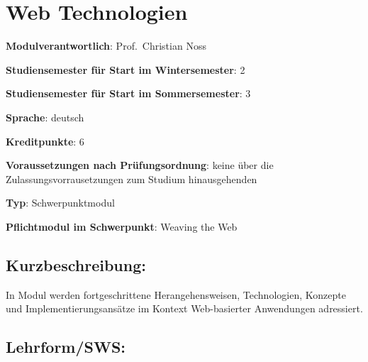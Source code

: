 \chapter{Web
Technologien\label{/mi-2017/modulbeschreibungen-master/MA_WTW_Modul_Web-Technologien}}\label{web-technologienpathlabelmi-2017modulbeschreibungen-mastermaux5fwtwux5fmodulux5fweb-technologien}

\begin{modulHead}
\textbf{Modulverantwortlich}: Prof.~Christian
Noss
\end{modulHead}
\begin{modulHead}
\textbf{Studiensemester für
Start im Wintersemester}:
2
\end{modulHead}
\begin{modulHead}
\textbf{Studiensemester für Start
im Sommersemester}:
3
\end{modulHead}
\begin{modulHead}
\textbf{Sprache}:
deutsch
\end{modulHead}
\begin{modulHead}
\textbf{Kreditpunkte}:
6
\end{modulHead}
\begin{modulHead}
\textbf{Voraussetzungen nach
Prüfungsordnung}: keine über die Zulassungsvorrausetzungen zum Studium
hinausgehenden
\end{modulHead}
\begin{modulHead}
\textbf{Typ}:
Schwerpunktmodul
\end{modulHead}
\begin{modulHead}
\textbf{Pflichtmodul
im Schwerpunkt}: Weaving the Web
\end{modulHead}


\section*{Kurzbeschreibung:\label{/mi-2017/modulbeschreibungen-master/MA_WTW_Modul_Web-Technologien}}\label{kurzbeschreibungpathlabelmi-2017modulbeschreibungen-mastermaux5fwtwux5fmodulux5fweb-technologien}

In Modul werden fortgeschrittene Herangehensweisen, Technologien,
Konzepte und Implementierungsansätze im Kontext Web-basierter
Anwendungen adressiert.

\section*{Lehrform/SWS:\label{/mi-2017/modulbeschreibungen-master/MA_WTW_Modul_Web-Technologien}}\label{lehrformswspathlabelmi-2017modulbeschreibungen-mastermaux5fwtwux5fmodulux5fweb-technologien}

